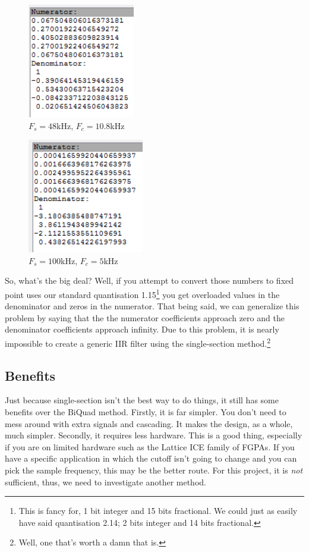 \documentclass[12pt,a4paper,titlepage]{article}
\begin{document}
\begin{figure}[!htb]
  \centering
  \includegraphics[height=5cm]
                  {../presentation/standard-coeffs-48kfs-10800fc.png}
                  \caption{$F_s = 48$kHz, $F_c = 10.8$kHz}
\end{figure}

\begin{figure}[!htb]
  \centering
  \includegraphics[height=5cm]
                  {../presentation/standard-coeffs-100kfs-5kfc.png}
                  \caption{$F_s = 100$kHz, $F_c = 5$kHz}
\end{figure}

So, what's the big deal? Well, if you attempt to convert those numbers to fixed
point uses our standard quantisation 1.15\footnote{This is fancy for, 1 bit
  integer and 15 bits fractional. We could just as easily have said quantisation
  2.14; 2 bits integer and 14 bits fractional.} you get overloaded values in the
denominator and zeros in the numerator. That being said, we can generalize this
problem by saying that the the numerator coefficients approach zero and the
denominator coefficients approach infinity. Due to this problem, it is nearly
impossible to create a generic IIR filter using the single-section
method.\footnote{Well, one that's worth a damn that is.}

\subsection{Benefits}
Just because single-section isn't the best way to do things, it still has some
benefits over the BiQuad method. Firstly, it is far simpler. You don't need to
mess around with extra signals and cascading. It makes the design, as a whole,
much simpler. Secondly, it requires less hardware. This is a good thing,
especially if you are on limited hardware such as the Lattice ICE family of
FGPAs. If you have a specific application in which the cutoff isn't going to
change and you can pick the sample frequency, this may be the better
route. For this project, it is \emph{not} sufficient, thus, we need to
investigate another method.
\end{document}
